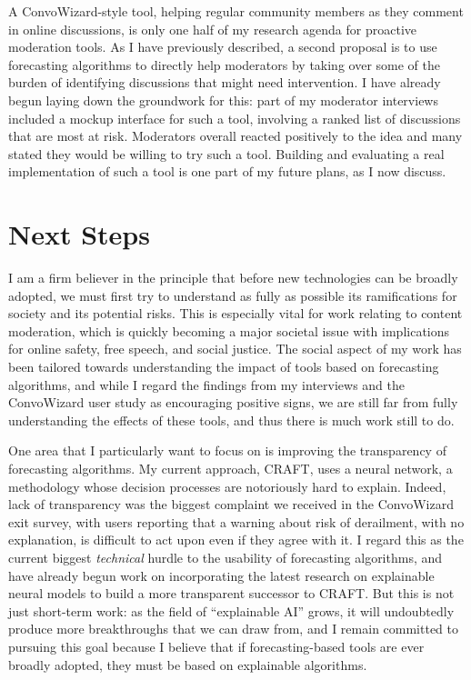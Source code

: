 \documentclass[11pt,letterpaper]{article}
\begin{document}
A ConvoWizard-style tool, helping regular community members as they comment in online discussions, is only one half of my research agenda for proactive moderation tools.
As I have previously described, a second proposal is to use forecasting algorithms to directly help moderators by taking over some of the burden of identifying discussions that might need intervention.
I have already begun laying down the groundwork for this: part of my moderator interviews included a mockup interface for such a tool, involving a ranked list of discussions that are most at risk.
Moderators overall reacted positively to the idea and many stated they would be willing to try such a tool.
Building and evaluating a real implementation of such a tool is one part of my future plans, as I now discuss.

\section{Next Steps}
I am a firm believer in the principle that before new technologies can be broadly adopted, we must first try to understand as fully as possible its ramifications for society and its potential risks.
This is especially vital for work relating to content moderation, which is quickly becoming a major societal issue with implications for online safety, free speech, and social justice.
The social aspect of my work has been tailored towards understanding the impact of tools based on forecasting algorithms, and while I regard the findings from my interviews and the ConvoWizard user study as encouraging positive signs, we are still far from fully understanding the effects of these tools, and thus there is much work still to do.

One area that I particularly want to focus on is improving the transparency of forecasting algorithms.
My current approach, CRAFT, uses a neural network, a methodology whose decision processes are notoriously hard to explain.
Indeed, lack of transparency was the biggest complaint we received in the ConvoWizard exit survey, with users reporting that a warning about risk of derailment, with no explanation, is difficult to act upon even if they agree with it.
I regard this as the current biggest \emph{technical} hurdle to the usability of forecasting algorithms, and have already begun work on incorporating the latest research on explainable neural models to build a more transparent successor to CRAFT.
But this is not just short-term work: as the field of ``explainable AI'' grows, it will undoubtedly produce more breakthroughs that we can draw from, and I remain committed to pursuing this goal because I believe that if forecasting-based tools are ever broadly adopted, they must be based on explainable algorithms.
\end{document}

